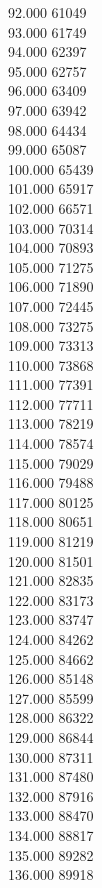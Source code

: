 { 92.000	61049 \\
 93.000	61749 \\
 94.000	62397 \\
 95.000	62757 \\
 96.000	63409 \\
 97.000	63942 \\
 98.000	64434 \\
 99.000	65087 \\
 100.000	65439 \\
 101.000	65917 \\
 102.000	66571 \\
 103.000	70314 \\
 104.000	70893 \\
 105.000	71275 \\
 106.000	71890 \\
 107.000	72445 \\
 108.000	73275 \\
 109.000	73313 \\
 110.000	73868 \\
 111.000	77391 \\
 112.000	77711 \\
 113.000	78219 \\
 114.000	78574 \\
 115.000	79029 \\
 116.000	79488 \\
 117.000	80125 \\
 118.000	80651 \\
 119.000	81219 \\
 120.000	81501 \\
 121.000	82835 \\
 122.000	83173 \\
 123.000	83747 \\
 124.000	84262 \\
 125.000	84662 \\
 126.000	85148 \\
 127.000	85599 \\
 128.000	86322 \\
 129.000	86844 \\
 130.000	87311 \\
 131.000	87480 \\
 132.000	87916 \\
 133.000	88470 \\
 134.000	88817 \\
 135.000	89282 \\
 136.000	89918 \\
}
